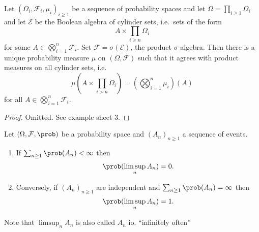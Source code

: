 \documentclass[a4paper]{article}
\renewcommand{\P}{\prob} %
\begin{document}
\begin{proposition}
  Let \((\Omega_i, \mathcal F_i, \mu_i)_{i \geq 1}\) be a sequence of probability spaces and let \(\Omega = \prod_{i \geq 1} \Omega_i\) and let \(\mathcal E\) be the Boolean algebra of cylinder sets, i.e.\ sets of the form
  \[
    A \times \prod_{i \geq n} \Omega_i
  \]
  for some \(A \in \bigotimes_{i = 1}^n \mathcal F_i\). Set \(\mathcal F = \sigma(\mathcal E)\), the product \(\sigma\)-algebra. Then there is a unique probability measure \(\mu\) on \((\Omega, \mathcal F)\) such that it agrees with product measures on all cylinder sets, i.e.
  \[
    \mu(A \times \prod_{i > n} \Omega_i) = (\bigotimes_{i = 1}^n \mu_i)(A)
  \]
  for all \(A \in \bigotimes_{i = 1}^n \mathcal F_i\).
\end{proposition}

\begin{proof}
  Omitted. See example sheet 3.
\end{proof}

\begin{lemma}
  Let \((\Omega, \mathcal F, \P)\) be a probability space and \((A_n)_{n \geq 1}\) a sequence of events.
  \begin{enumerate}
  \item If \(\sum_{n \geq 1} \P(A_n) < \infty\) then
    \[
      \P(\limsup_n A_n) = 0.
    \]
  \item Conversely, if \((A_n)_{n \geq 1}\) are independent and \(\sum_{n \geq 1} \P(A_n) = \infty\) then
    \[
      \P(\limsup_n A_n) = 1.
    \]
  \end{enumerate}
\end{lemma}

Note that \(\limsup_n A_n\) is also called \(A_n\) io. ``infinitely often''
\end{document}
